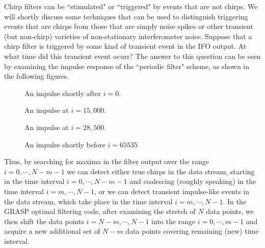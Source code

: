 Chirp filters can be ``stimulated" or ``triggered" by events that are
not chirps.  We will shortly discuss some techniques that can be used
to distinguish triggering events that are chirps from those that are
simply noise spikes or other transient (but non-chirp) varieties of
non-stationary interferometer noise.  Suppose that a chirp filter is
triggered by some kind of transient event in the IFO output.  At what
time did this transient event ocurr?  The answer to this question can
be seen by examining the impulse response of the ``periodic filter"
scheme, as shown in the following figures.
\begin{figure}[h]
\begin{center}
\caption{ \label{f:chirpd} An impulse shortly after $i=0$.}
\end{center}
\end{figure}
\begin{figure}[h]
\begin{center}
\caption{ \label{f:chirpe} An impulse at $i=15,000$.}
\end{center}
\end{figure}
\begin{figure}[h]
\begin{center}
\caption{ \label{f:chirpf} An impulse at $i=28,500$.}
\end{center}
\end{figure}
\begin{figure}[h]
\begin{center}
\caption{ \label{f:chirpg} An impulse shortly before $i=65535$}
\end{center}
\end{figure}
Thus, by searching for maxima in the filter output over the range
$i=0,\cdots,N-m-1$ we can detect either true chirps in the data stream,
starting in the time interval $i=0,\cdots,N-m-1$ and coalescing
(roughly speaking) in the time interval $i=m,\cdots, N-1$, or we can
detect transient impulse-like events in the data stream, which take
place in the time interval $i=m,\cdots, N-1$.  In the GRASP optimal
filtering code, after examining the stretch of $N$ data points, we then
shift the data points $i=N-m,\cdots,N-1$ into the range
$i=0,\cdots,m-1$ and acquire a new additional set of $N-m$ data points
covering remaining (new) time interval.

